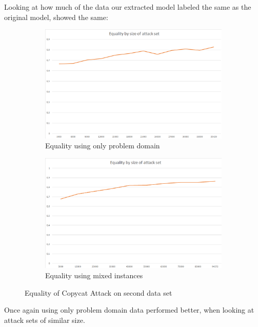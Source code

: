 \documentclass[a4paper,11pt]{article}
\begin{document}
        Looking at how much of the data our extracted model labeled the same as the original model, showed the same:
         \begin{figure}[h!]
            \centering
            \begin{subfigure}[c]{0.49\textwidth}
                \centering
                \includegraphics[width=1\textwidth]{exercise_3/paper/images/Equality_copy_cat_domain.png}
                \caption{Equality using only problem domain}
                \label{fig:Equality_cat_domain}
            \end{subfigure}
            \begin{subfigure}[c]{0.49\textwidth}
                \centering
                \includegraphics[width=1\textwidth]{exercise_3/paper/images/Equality_copy_cat.png}
                \caption{Equality using mixed instances}
                \label{fig:Equality_cat_mix}
            \end{subfigure}
            \caption{Equality of Copycat Attack on second data set}
            \label{fig:equality_cat}
        \end{figure}
    Once again using only problem domain data performed better, when looking at attack sets of similar size.
    
\end{document}
